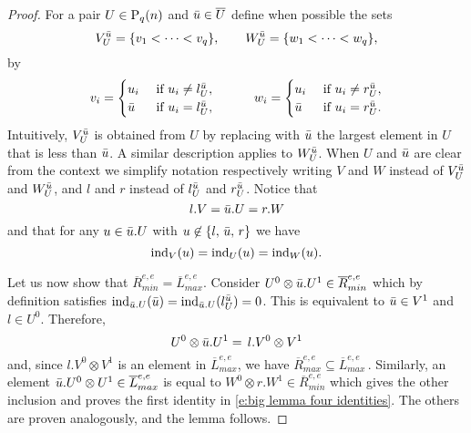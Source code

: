 \begin{proof}
	For a pair $U \in \P_q(n)$ and $\bu \in \overline{U}$ define when possible the sets 
	\begin{equation*}
	V^\bu_U = \{v_1 < \cdots < v_q\}, \qquad W_U^\bu = \{w_1 < \cdots < w_q\},
	\end{equation*}
	by
	\begin{align*}
	v_i = 
	\begin{cases}
	u_i & \text{ if } u_i \neq l_U^\bu, \\
	\bu	& \text{ if } u_i = l_U^\bu,
	\end{cases}
	\qquad \quad
	w_i = 
	\begin{cases}
	u_i & \text{ if } u_i \neq r_U^\bu, \\
	\bu	& \text{ if } u_i = r_U^\bu.
	\end{cases}
	\end{align*}
	Intuitively, $V_U^\bu$ is obtained from $U$ by replacing with $\bu$ the largest element in $U$ that is less than $\bu$.
	A similar description applies to $W_U^\bu$.
	When $U$ and $\bu$ are clear from the context we simplify notation respectively writing $V$ and $W$ instead of $V^\bu_U$ and $W^\bu_U$, and $l$ and $r$ instead of $l_U^\bu$ and $r_U^\bu$.
	Notice that
	\begin{equation*}
	l.V = \bu.U = r.W
	\end{equation*}
	and that for any $u \in \bu.U$ with $u \not \in \{l,\, \bu,\, r\}$ we have
	\begin{equation*}
	\ind_{V}(u) = \ind_{U}(u) = \ind_{W}(u).
	\end{equation*}
	
	Let us now show that $\overline{R}_{min}^{e,e} = \overline{L}_{max}^{e,e}$.
	Consider $U^0 \otimes \bu.U^1 \in \overline{R}_{min}^{e, e}$ which by definition satisfies $\ind_{\bu.U}(\bu) = \ind_{\bu.U}(l_{U}^\bu) = 0$.
	This is equivalent to $\bu \in V^1$ and $l \in U^0$.
	Therefore, 
	\begin{equation*}
	U^0 \otimes \bu.U^1 = \, l.V^0 \otimes V^1
	\end{equation*}
	and, since $l.V^0 \otimes V^1$ is an element in $\overline{L}_{max}^{e,e}$, we have $\overline{R}_{max}^{e,e} \subseteq \overline{L}_{max}^{e,e}$\,.
	Similarly, an element $\bu.U^0 \otimes U^1 \in \overline{L}_{max}^{e,e}$ is equal to $W^0 \otimes r.W^1 \in \overline{R}_{min}^{e,e}$ which gives the other inclusion and proves the first identity in \eqref{e:big lemma four identities}.
	The others are proven analogously, and the lemma follows.
\end{proof}

